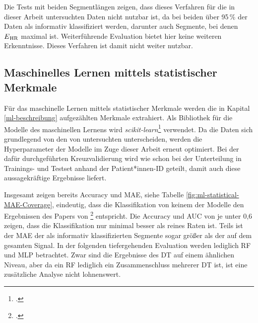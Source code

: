 Die Tests mit beiden Segmentlängen zeigen, dass dieses Verfahren für die in dieser Arbeit untersuchten Daten nicht nutzbar ist, da bei beiden über 95\,\% der Daten als informativ klassifiziert werden, darunter auch Segmente, bei denen $E\textsubscript{HR}$ maximal ist. Weiterführende Evaluation bietet hier keine weiteren Erkenntnisse. Dieses Verfahren ist damit nicht weiter nutzbar.

\subsection{Maschinelles Lernen mittels statistischer Merkmale}\label{res-statistical}

Für das maschinelle Lernen mittels statistischer Merkmale werden die in Kapital \ref{ml-beschreibung} aufgezählten Merkmale extrahiert. Als Bibliothek für die Modelle des maschinellen Lernens wird \textit{scikit-learn}\footcite[]{scikit-learn} verwendet. Da die Daten sich grundlegend von den von \citeauthor{Sadek2016} untersuchten unterscheiden, werden die Hyperparameter der Modelle im Zuge dieser Arbeit erneut optimiert. Bei der dafür durchgeführten Kreuzvalidierung wird wie schon bei der Unterteilung in Trainings- und Testset anhand der Patient*innen-ID geteilt, damit auch diese aussagekräftige Ergebnisse liefert.

Insgesamt zeigen bereits Accuracy und \ac{MAE}, siehe Tabelle \ref{fig:ml-statistical-MAE-Coverage}, eindeutig, dass die Klassifikation von keinem der Modelle den Ergebnissen des Papers von \citeauthor{Sadek2016}\footcite{Sadek2016} entspricht. Die Accuracy und AUC von je unter 0,6 zeigen, dass die Klassifikation nur minimal besser als reines Raten ist. Teils ist der \ac{MAE} der als informativ klassifizierten Segmente sogar größer als der auf dem gesamten Signal. In der folgenden tiefergehenden Evaluation werden lediglich \ac{RF} und \ac{MLP} betrachtet. Zwar sind die Ergebnisse des \ac{DT} auf einem ähnlichen Niveau, aber da ein \ac{RF} lediglich ein Zusammenschluss mehrerer \ac{DT} ist, ist eine zusätzliche Analyse nicht lohnenswert. 

